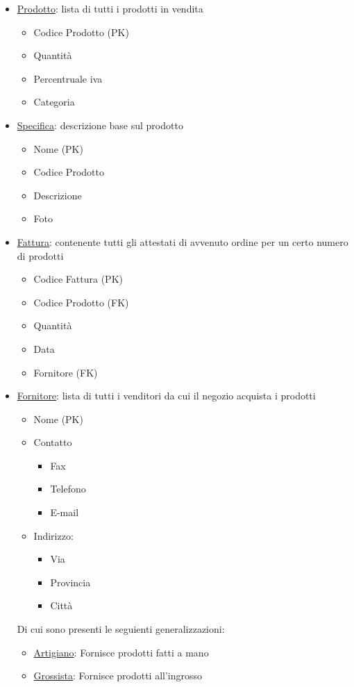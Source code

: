 \begin{itemize}
\item \underline{Prodotto}: lista di tutti i prodotti in vendita
  \begin{itemize}
  \item Codice Prodotto (PK)
  \item Quantit\`a
  \item Percentruale iva
  \item Categoria
  \end{itemize}

\item \underline{Specifica}: descrizione base sul prodotto
  \begin{itemize}
  \item Nome (PK)
  \item Codice Prodotto
  \item Descrizione
  \item Foto
  \end{itemize}

\item \underline{Fattura}: contenente tutti gli attestati di avvenuto ordine per un certo numero di prodotti
  \begin{itemize}
  \item Codice Fattura (PK)
  \item Codice Prodotto (FK)
  \item Quantit\`a
  \item Data
  \item Fornitore (FK)
  \end{itemize}

\item \underline{Fornitore}: lista di tutti i venditori da cui il negozio acquista i prodotti
  \begin{itemize}
  \item Nome (PK)
  \item Contatto
    \begin{itemize}
    \item Fax
    \item Telefono
    \item E-mail
    \end{itemize}

  \item Indirizzo:
    \begin{itemize}
    \item Via
    \item Provincia
    \item Citt\`a
    \end{itemize}
  \end{itemize}
  Di cui sono presenti le seguienti generalizzazioni:
  \begin{itemize}
  \item \underline{Artigiano}: Fornisce prodotti fatti a mano
  \item \underline{Grossista}: Fornisce prodotti all'ingrosso
  \end{itemize}


\end{itemize}
